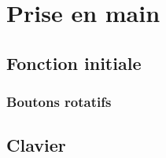 %
\chapter{Prise en main}
%
\section{Fonction initiale}
\newpage
\subsection{Boutons rotatifs}

\section{Clavier}
